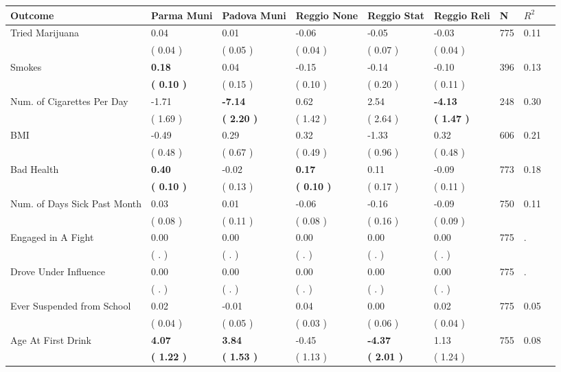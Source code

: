 \begin{tabular}{L{6.2cm} C{1.8cm} C{1.8cm} C{1.8cm} C{1.8cm} C{1.8cm} C{1.8cm} C{0.3cm} C{0.3cm}}
\toprule
 \textbf{Outcome} & \textbf{Parma Muni} & \textbf{Padova Muni} & \textbf{Reggio None} & \textbf{Reggio Stat} & \textbf{Reggio Reli} & \textbf{N} & \textbf{$ R^2$} \\
\midrule
Tried Marijuana &      0.04 &      0.01 &     -0.06 &     -0.05 &     -0.03  & 775 &       0.11 \\ 
 & (     0.04 ) & (     0.05 ) & (     0.04 ) & (     0.07 ) & (     0.04 )  & \\
Smokes & \textbf{     0.18} &      0.04 &     -0.15 &     -0.14 &     -0.10  & 396 &       0.13 \\ 
 & \textbf{(     0.10 )} & (     0.15 ) & (     0.10 ) & (     0.20 ) & (     0.11 )  & \\
Num. of Cigarettes Per Day &     -1.71 & \textbf{    -7.14} &      0.62 &      2.54 & \textbf{    -4.13}  & 248 &       0.30 \\ 
 & (     1.69 ) & \textbf{(     2.20 )} & (     1.42 ) & (     2.64 ) & \textbf{(     1.47 )}  & \\
BMI &     -0.49 &      0.29 &      0.32 &     -1.33 &      0.32  & 606 &       0.21 \\ 
 & (     0.48 ) & (     0.67 ) & (     0.49 ) & (     0.96 ) & (     0.48 )  & \\
Bad Health & \textbf{     0.40} &     -0.02 & \textbf{     0.17} &      0.11 &     -0.09  & 773 &       0.18 \\ 
 & \textbf{(     0.10 )} & (     0.13 ) & \textbf{(     0.10 )} & (     0.17 ) & (     0.11 )  & \\
Num. of Days Sick Past Month &      0.03 &      0.01 &     -0.06 &     -0.16 &     -0.09  & 750 &       0.11 \\ 
 & (     0.08 ) & (     0.11 ) & (     0.08 ) & (     0.16 ) & (     0.09 )  & \\
Engaged in A Fight &      0.00 &      0.00 &      0.00 &      0.00 &      0.00  & 775 &          . \\ 
 & (        . ) & (        . ) & (        . ) & (        . ) & (        . )  & \\
Drove Under Influence &      0.00 &      0.00 &      0.00 &      0.00 &      0.00  & 775 &          . \\ 
 & (        . ) & (        . ) & (        . ) & (        . ) & (        . )  & \\
Ever Suspended from School &      0.02 &     -0.01 &      0.04 &      0.00 &      0.02  & 775 &       0.05 \\ 
 & (     0.04 ) & (     0.05 ) & (     0.03 ) & (     0.06 ) & (     0.04 )  & \\
Age At First Drink & \textbf{     4.07} & \textbf{     3.84} &     -0.45 & \textbf{    -4.37} &      1.13  & 755 &       0.08 \\ 
 & \textbf{(     1.22 )} & \textbf{(     1.53 )} & (     1.13 ) & \textbf{(     2.01 )} & (     1.24 )  & \\
\bottomrule
\end{tabular}
